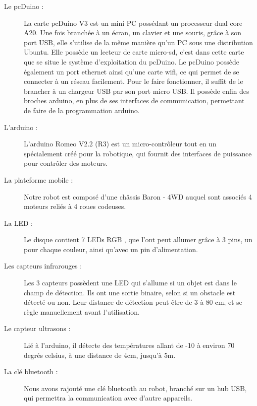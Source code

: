 \documentclass[12pt,francais]{report}
\begin{document}
\begin{description}
\item [Le pcDuino :] La carte pcDuino V3 est un mini PC possédant un processeur dual core A20. Une fois branchée à un écran, un clavier et une souris, grâce à son port USB, elle s'utilise de la même manière qu'un PC sous une distribution Ubuntu. Elle possède un lecteur de carte micro-sd,  c'est dans cette carte que se situe le système d'exploitation du pcDuino. Le pcDuino possède également un port ethernet ainsi qu'une carte wifi, ce qui permet de se connecter à un réseau facilement. Pour le faire fonctionner, il suffit de le brancher à un chargeur USB par son port micro USB. Il possède enfin des broches arduino, en plus de ses interfaces de communication, permettant de faire de la programmation arduino.\cite{ref3}
\item [L'arduino :] L'arduino Romeo V2.2 (R3) \cite{ref4} est un micro-contrôleur tout en un spécialement créé pour la robotique, qui fournit des interfaces de puissance pour contrôler des moteurs.
\item [La plateforme mobile :] Notre robot est composé d'une châssis Baron - 4WD auquel sont associés 4 moteurs reliés à 4 roues codeuses. \cite{ref5}
\item [La LED :] Le disque contient 7 LEDs RGB \cite{ref6}, que l'ont peut allumer grâce à 3 pins, un pour chaque couleur, ainsi qu'avec un pin d'alimentation.
\item [Les capteurs infrarouges :] Les 3 capteurs possèdent une LED qui s'allume si un objet est dans le champ de détection. Ils ont une sortie binaire, selon si un obstacle est détecté ou non. Leur distance de détection peut être de 3 à 80 cm, et se règle manuellement avant l'utilisation. \cite{ref7}
\item [Le capteur ultrasons :] Lié à l'arduino, il détecte des températures allant de -10 à environ 70 degrés celsius, à une distance de 4cm, jusqu'à 5m. \cite{ref8}
\item [La clé bluetooth :] Nous avons rajouté une clé bluetooth au robot, branché sur un hub USB, qui permettra la communication avec d'autre appareils.
\end{description}
\end{document}
